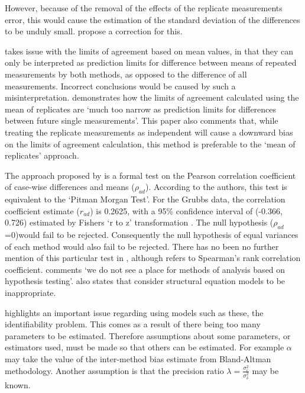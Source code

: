 \documentclass[12pt, a4paper]{report}
\begin{document}
	
	However, because of the removal of the effects of the replicate
	measurements error, this would cause the estimation of the
	standard deviation of the differences to be unduly small.
	\citet*{BA86} propose a correction for this.
	
	\citet{BXC2008} takes issue with the limits of agreement based on
	mean values, in that they can only be interpreted as prediction
	limits for difference between means of repeated measurements by
	both methods, as opposed to the difference of all measurements.
	Incorrect conclusions would be caused by such a misinterpretation.
	\citet{BXC2008} demonstrates how the limits of agreement
	calculated using the mean of replicates are `much too narrow as
	prediction limits for differences between future single
	measurements'. This paper also comments that, while treating the
	replicate measurements as independent will cause a downward bias
	on the limits of agreement calculation, this method is preferable
	to the `mean of replicates' approach.
	
	The approach proposed by \citet{BA83} is a formal test on the
	Pearson correlation coefficient of case-wise differences and means
	($\rho_{ad}$). According to the authors, this test is equivalent
	to the `Pitman Morgan Test'. For the Grubbs data, the correlation
	coefficient estimate ($r_{ad}$) is 0.2625, with a 95\% confidence
	interval of (-0.366, 0.726) estimated by Fishers `r to z'
	transformation \citep*{Cohen}. The null hypothesis ($\rho_{ad}$
	=0)would fail to be rejected. Consequently the null hypothesis of
	equal variances of each method would also fail to be rejected.
	There has no been no further mention of this particular test in
	\citet{BA86}, although \citet{BA99} refers to Spearman's rank
	correlation coefficient. \citet{BA99} comments `we do not see a
	place for methods of analysis based on hypothesis testing'.
	\citet{BA99} also states that consider structural equation models
	to be inappropriate.
	
	\citet{DunnSEME} highlights an important issue regarding using
	models such as these, the identifiability problem. This comes as a
	result of there being too many parameters to be estimated.
	Therefore assumptions about some parameters, or estimators used,
	must be made so that others can be estimated. For example $\alpha$
	may take the value of the inter-method bias estimate from
	Bland-Altman methodology. Another assumption is that the precision
	ratio $\lambda=\frac{\sigma^{2}_{\epsilon}}{\sigma^{2}_{\delta}}$
	may be known.
	
\end{document}
